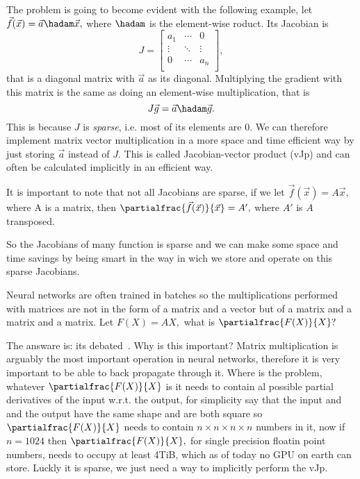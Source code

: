 \documentclass{article}
\begin{document}
The problem is going to become evident with the following example, let \(\vec
f(\vec x) = \vec a \hadam \vec x,\) where \(\hadam\) is the element-wise
roduct. Its Jacobian is \[
J = \left[\begin{array}{ccc}
a_1 & \cdots & 0 \\
\vdots & \ddots & \vdots \\
0 & \cdots & a_n \\
\end{array}\right]\!,
\] that is a diagonal matrix with \(\vec a\) as its diagonal. Multiplying the
gradient with this matrix is the same as doing an element-wise multiplication,
that is \[
J \vec g = \vec a \hadam \vec g.
\] This is because \(J\) is \emph{sparse}, i.e. most of its elements are 0.
We can therefore implement matrix vector multiplication in a more space and
time efficient way by just storing \(\vec a\) instead of \(J.\) This is called
Jacobian-vector product (vJp) and can often be calculated implicitly in an
efficient way.

It is important to note that not all Jacobians are sparse, if we let \(\vec
f(\vec x) = A \vec x,\) where A is a matrix, then
\(\partialfrac{\vec f(\vec x)}{\vec x} = A',\) where \(A'\) is \(A\)
transposed.

So the Jacobians of many function is sparse and we can make some space and time
savings by being smart in the way in wich we store and operate on this sparse
Jacobians.

Neural networks are often trained in batches so the multiplications performed
with matrices are not in the form of a matrix and a vector but of a matrix and
a matrix and a matrix. Let \(F(X) = AX,\) what is \(\partialfrac{F(X)}{X}?\)

The answare is: its debated~\cite{notion}. Why is this important? Matrix multiplication is
arguably the most important operation in neural networks, therefore it is very
important to be able to back propagate through it. Where is the problem,
whatever \(\partialfrac{F(X)}{X}\) is it needs to contain al possible partial
derivatives of the input w.r.t. the output, for simplicity say that the input
and and the output have the same shape and are both square so
\(\partialfrac{F(X)}{X}\) needs to contain \(n \times n \times n \times n\)
numbers in it, now if \(n=1024\) then \(\partialfrac{F(X)}{X},\) for single
precision floatin point numbers, needs to occupy at least 4TiB, which as of
today no GPU on earth can store. Luckly it is sparse, we just need a way to
implicitly perform the vJp.
\end{document}
